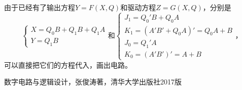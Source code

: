 \documentclass[UTF8]{ctexart}
\begin{document}
由于已经有了输出方程$Y=F(X,Q)$和驱动方程$Z=G(X,Q)$，分别是
\[\begin{cases} X=Q_0B+Q_1B+Q_1A\\ Y=Q_1B \end{cases}和\begin{cases} J_1=Q_0'B+Q_0A\\ K_1=(A'B'+Q_0A)'=Q_0A+B\\ J_0=Q_1'A\\ K_0=(A'B')'=A+B \end{cases}，\]
可以直接把它们的方程代入，画出电路。

\begin{thebibliography}{5}
     数字电路与逻辑设计，张俊涛著，清华大学出版社2017版
\end{thebibliography}
\end{document}
